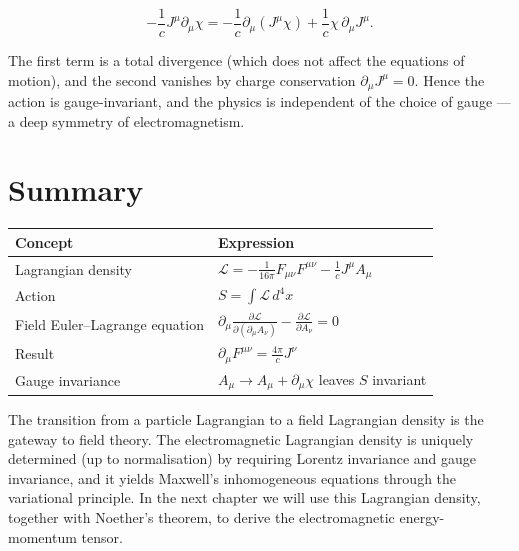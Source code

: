 \begin{equation}
-\frac{1}{c}J^\mu\partial_\mu\chi = -\frac{1}{c}\partial_\mu(J^\mu\chi) + \frac{1}{c}\chi\,\partial_\mu J^\mu.
\end{equation}

The first term is a total divergence (which does not affect the equations of motion), and the second vanishes by charge conservation $\partial_\mu J^\mu = 0$. Hence the action is gauge-invariant, and the physics is independent of the choice of gauge --- a deep symmetry of electromagnetism.

\section{Summary}

\begin{table}[h]
\centering
\renewcommand{\arraystretch}{1.4}
\begin{tabular}{ll}
\toprule
\textbf{Concept} & \textbf{Expression} \\
\midrule
Lagrangian density & $\mathcal{L} = -\frac{1}{16\pi}F_{\mu\nu}F^{\mu\nu} - \frac{1}{c}J^\mu A_\mu$ \\
Action & $S = \int\mathcal{L}\,d^4x$ \\
Field Euler--Lagrange equation & $\partial_\mu\frac{\partial\mathcal{L}}{\partial(\partial_\mu A_\nu)} - \frac{\partial\mathcal{L}}{\partial A_\nu} = 0$ \\
Result & $\partial_\mu F^{\mu\nu} = \frac{4\pi}{c}J^\nu$ \\
Gauge invariance & $A_\mu \to A_\mu + \partial_\mu\chi$ leaves $S$ invariant \\
\bottomrule
\end{tabular}
\end{table}

The transition from a particle Lagrangian to a field Lagrangian density is the gateway to field theory. The electromagnetic Lagrangian density is uniquely determined (up to normalisation) by requiring Lorentz invariance and gauge invariance, and it yields Maxwell's inhomogeneous equations through the variational principle. In the next chapter we will use this Lagrangian density, together with Noether's theorem, to derive the electromagnetic energy-momentum tensor.
